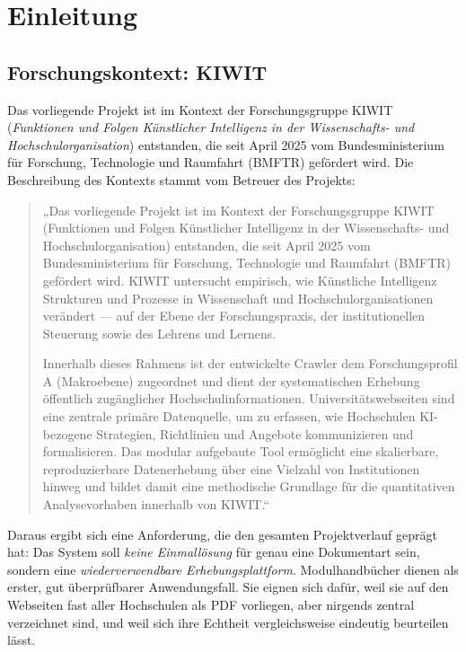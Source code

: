 \chapter{Einleitung}\label{ch:einleitung}

\section{Forschungskontext: KIWIT}
Das vorliegende Projekt ist im Kontext der Forschungsgruppe KIWIT (\emph{Funktionen und Folgen Künstlicher Intelligenz in der Wissenschafts- und Hochschulorganisation}) entstanden, die seit April 2025 vom Bundesministerium für Forschung, Technologie und Raumfahrt (BMFTR) gefördert wird. Die Beschreibung des Kontexts stammt vom Betreuer des Projekts:

\begin{quote}\small
„Das vorliegende Projekt ist im Kontext der Forschungsgruppe KIWIT (Funktionen und Folgen Künstlicher Intelligenz in der Wissenschafts- und Hochschulorganisation) entstanden, die seit April 2025 vom Bundesministerium für Forschung, Technologie und Raumfahrt (BMFTR) gefördert wird. KIWIT untersucht empirisch, wie Künstliche Intelligenz Strukturen und Prozesse in Wissenschaft und Hochschulorganisationen verändert --- auf der Ebene der Forschungspraxis, der institutionellen Steuerung sowie des Lehrens und Lernens.

Innerhalb dieses Rahmens ist der entwickelte Crawler dem Forschungsprofil A (Makroebene) zugeordnet und dient der systematischen Erhebung öffentlich zugänglicher Hochschulinformationen. Universitätswebseiten sind eine zentrale primäre Datenquelle, um zu erfassen, wie Hochschulen KI-bezogene Strategien, Richtlinien und Angebote kommunizieren und formalisieren. Das modular aufgebaute Tool ermöglicht eine skalierbare, reproduzierbare Datenerhebung über eine Vielzahl von Institutionen hinweg und bildet damit eine methodische Grundlage für die quantitativen Analysevorhaben innerhalb von KIWIT.“
\end{quote}

Daraus ergibt sich eine Anforderung, die den gesamten Projektverlauf geprägt hat: Das System soll \emph{keine Einmallösung} für genau eine Dokumentart sein, sondern eine \emph{wiederverwendbare Erhebungsplattform}. Modulhandbücher dienen als erster, gut überprüfbarer Anwendungsfall. Sie eignen sich dafür, weil sie auf den Webseiten fast aller Hochschulen als PDF vorliegen, aber nirgends zentral verzeichnet sind, und weil sich ihre Echtheit vergleichsweise eindeutig beurteilen lässt.

